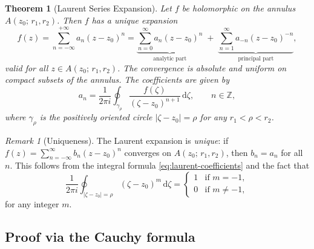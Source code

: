 \documentclass[12pt,a4paper,openany]{book}
\theoremstyle{definition}
\theoremstyle{plain}
\newtheorem{theorem}[definition]{Theorem}
\theoremstyle{remark}
\newtheorem{remark}[definition]{Remark}
\newcommand{\Z}{\mathbb{Z}}
\newcommand{\dd}{\mathrm{d}}
\newcommand{\abs}[1]{\left|#1\right|}
\begin{document}
\begin{theorem}[Laurent Series Expansion]\label{thm:laurent}
Let $f$ be holomorphic on the annulus $A(z_0;\,r_1,r_2)$. Then $f$ has a unique
expansion
\begin{equation}\label{eq:laurent}
  f(z) = \sum_{n=-\infty}^{+\infty}a_n(z-z_0)^n
  = \underbrace{\sum_{n=0}^{\infty}a_n(z-z_0)^n}_{\text{analytic part}}
  \;+\; \underbrace{\sum_{n=1}^{\infty}a_{-n}(z-z_0)^{-n}}_{\text{principal part}},
\end{equation}
valid for all $z\in A(z_0;\,r_1,r_2)$. The convergence is absolute and uniform
on compact subsets of the annulus. The coefficients are given by
\begin{equation}\label{eq:laurent-coefficients}
  a_n = \frac{1}{2\pi i}\oint_{\gamma_\rho}\frac{f(\zeta)}{(\zeta-z_0)^{n+1}}\,\dd\zeta,
  \qquad n\in\Z,
\end{equation}
where $\gamma_\rho$ is the positively oriented circle $\abs{\zeta-z_0}=\rho$ for
any $r_1<\rho<r_2$.
\end{theorem}

\begin{remark}[Uniqueness]\label{rem:laurent-uniqueness}
The Laurent expansion is \emph{unique}: if $f(z)=\sum_{n=-\infty}^{\infty}b_n(z-z_0)^n$
converges on $A(z_0;\,r_1,r_2)$, then $b_n=a_n$ for all $n$. This follows from
the integral formula \eqref{eq:laurent-coefficients} and the fact that
\[
  \frac{1}{2\pi i}\oint_{\abs{\zeta-z_0}=\rho}(\zeta-z_0)^{m}\,\dd\zeta
  = \begin{cases} 1 & \text{if } m=-1, \\ 0 & \text{if } m\ne -1, \end{cases}
\]
for any integer $m$.
\end{remark}

\subsection{Proof via the Cauchy formula}
\end{document}
